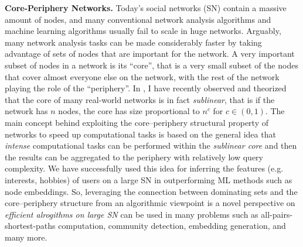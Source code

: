 \documentclass[11pt]{article}
\begin{document}
\noindent \textbf{Core-Periphery Networks.} Today's social networks (SN) contain a massive amount of nodes, and many conventional network analysis algorithms and machine learning algorithms usually fail to scale in huge networks. Arguably, many network analysis tasks can be made considerably faster by taking advantage of sets of nodes that are important for the network. A very important subset of nodes in a network is its ``core'', that is a very small  subset of the nodes that cover almost everyone else on the network, with the rest of the network playing the role of the ``periphery''. In \cite{papachristou2021sublinear}, I have recently observed and theorized that the core of many real-world networks is in fact \emph{sublinear}, that is if the network has $n$ nodes, the core has size proportional to $n^c$ for $c \in (0, 1)$. The main concept behind exploiting the core--periphery structural property of networks to speed up computational tasks is based on the general idea that \emph{intense} computational tasks can be performed within the \emph{sublinear core} and then the results can be aggregated to the periphery with relatively low query complexity. We have successfully used this idea for inferring the features (e.g. interests, hobbies) of users on a large SN in \cite{papachristou2021stochastic} outperforming ML methods such as node embeddings.  So, leveraging the connection between dominating sets and the core--periphery structure from an algorithmic viewpoint is   a novel perspective on \emph{efficient alrogithms on large SN} can be used in many problems such as all-pairs-shortest-paths computation, community detection, embedding generation, and many more. 




\nocite{*}

{\small


}
\end{document}
